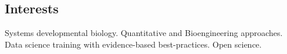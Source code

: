 \documentclass[margin,line]{res}
\begin{document}
\begin{resume}

\vspace*{.15in}

\section{\sc Interests}%

Systems developmental biology. Quantitative and Bioengineering approaches. \\
Data science training with evidence-based best-practices. Open science.





\end{resume}
\end{document}
